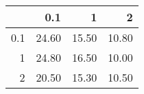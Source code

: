 \begin{tabular}{rrrr}
  \hline
 & 0.1 & 1 & 2 \\ 
  \hline
0.1 & 24.60 & 15.50 & 10.80 \\ 
  1 & 24.80 & 16.50 & 10.00 \\ 
  2 & 20.50 & 15.30 & 10.50 \\ 
   \hline
\end{tabular}

